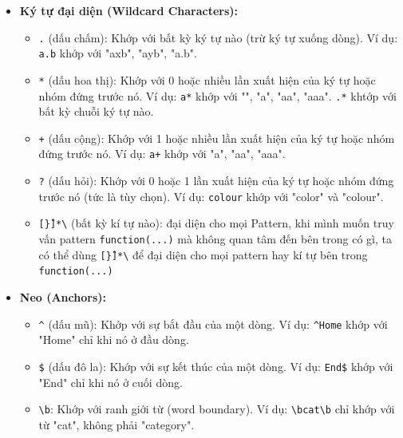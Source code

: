 \documentclass[11pt]{article}
\begin{document}
\begin{itemize}
    \item \textbf{Ký tự đại diện (Wildcard Characters):}
    \begin{itemize}
        \item  \colorbox{codehighlight} {\texttt{.}} (dấu chấm): Khớp với bất kỳ ký tự nào (trừ ký tự xuống dòng). Ví dụ: {\texttt{a.b}} khớp với "axb", "ayb", "a.b".
        \item  \colorbox{codehighlight} {\texttt{*}} (dấu hoa thị): Khớp với 0 hoặc nhiều lần xuất hiện của ký tự hoặc nhóm đứng trước nó. Ví dụ: {\texttt{a*}} khớp với "", "a", "aa", "aaa". {\texttt{.*}} khtớp với bất kỳ chuỗi ký tự nào.
        \item  \colorbox{codehighlight} {\texttt{+}} (dấu cộng): Khớp với 1 hoặc nhiều lần xuất hiện của ký tự hoặc nhóm đứng trước nó. Ví dụ: {\texttt{a+}} khớp với "a", "aa", "aaa".
        \item  \colorbox{codehighlight} {\texttt{?}} (dấu hỏi): Khớp với 0 hoặc 1 lần xuất hiện của ký tự hoặc nhóm đứng trước nó (tức là tùy chọn). Ví dụ: {\texttt{colour}} khớp với "color" và "colour".
        \item \colorbox{codehighlight}{\texttt{[\^\}]*\textbackslash}} (bất kỳ kí tự nào): đại diện cho mọi Pattern, khi mình muốn truy vấn pattern \texttt{function(...)} mà không quan tâm đến bên trong có gì, ta có thể dùng  \colorbox{codehighlight}{\texttt{[\^\}]*\textbackslash}} để đại diện cho mọi pattern hay kí tự bên trong \texttt{function(...)}
    \end{itemize}

    \item \textbf{Neo (Anchors):}
    \begin{itemize}
        \item  \colorbox{codehighlight} {\texttt{\textasciicircum}} (dấu mũ): Khớp với sự bắt đầu của một dòng. Ví dụ: {\texttt{\textasciicircum Home}} khớp với "Home" chỉ khi nó ở đầu dòng.
        \item  \colorbox{codehighlight} {\texttt{\$}} (dấu đô la): Khớp với sự kết thúc của một dòng. Ví dụ: {\texttt{End\$}} khớp với "End" chỉ khi nó ở cuối dòng.
        \item  \colorbox{codehighlight} {\texttt{\textbackslash b}}: Khớp với ranh giới từ (word boundary). Ví dụ: {\texttt{\textbackslash bcat\textbackslash b}} chỉ khớp với từ "cat", không phải "category".
    \end{itemize}


\end{itemize}
\end{document}
